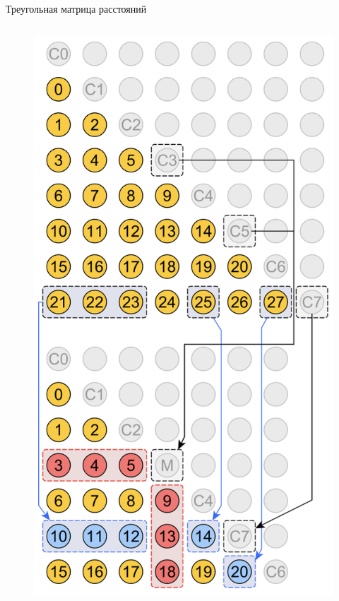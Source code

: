\begin{frame}{Треугольная матрица расстояний}
\begin{columns}
\begin{figure}
            \includegraphics[height=0.75\textheight]{res/dist_matrix.png}
        \end{figure}
    \end{columns}
\end{frame}

